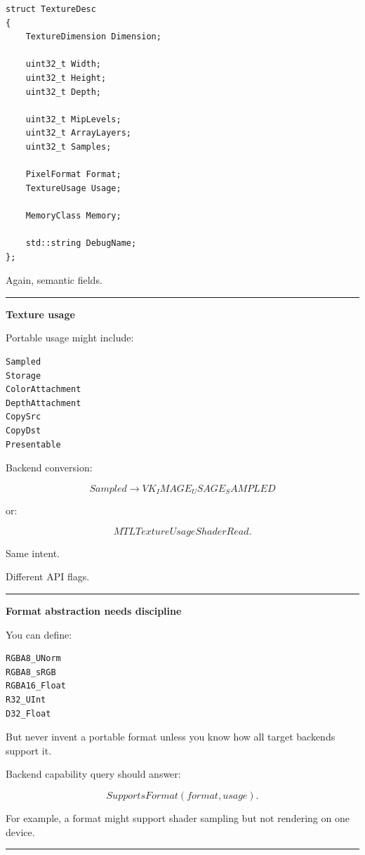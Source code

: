 \begin{verbatim}
struct TextureDesc
{
    TextureDimension Dimension;

    uint32_t Width;
    uint32_t Height;
    uint32_t Depth;

    uint32_t MipLevels;
    uint32_t ArrayLayers;
    uint32_t Samples;

    PixelFormat Format;
    TextureUsage Usage;

    MemoryClass Memory;

    std::string DebugName;
};
\end{verbatim}

Again, semantic fields.

\begin{center}\rule{0.5\linewidth}{0.5pt}\end{center}

\textbf{Texture usage}

Portable usage might include:

\begin{verbatim}
Sampled
Storage
ColorAttachment
DepthAttachment
CopySrc
CopyDst
Presentable
\end{verbatim}

Backend conversion:

\[
Sampled
\rightarrow
VK_IMAGE_USAGE_SAMPLED
\]

or:

\[
MTLTextureUsageShaderRead.
\]

Same intent.

Different API flags.

\begin{center}\rule{0.5\linewidth}{0.5pt}\end{center}

\textbf{Format abstraction needs discipline}

You can define:

\begin{verbatim}
RGBA8_UNorm
RGBA8_sRGB
RGBA16_Float
R32_UInt
D32_Float
\end{verbatim}

But never invent a portable format unless you know how all target backends support it.

Backend capability query should answer:

\[
SupportsFormat(
format,
usage).
\]

For example, a format might support shader sampling but not rendering on one device.

\begin{center}\rule{0.5\linewidth}{0.5pt}\end{center}

